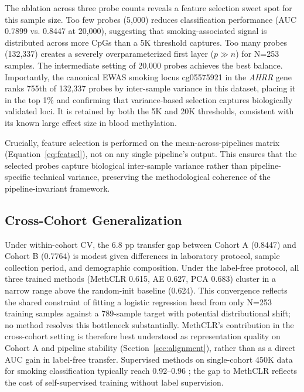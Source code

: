 \documentclass[conference]{IEEEtran}
\begin{document}
The ablation across three probe counts reveals a feature selection sweet spot for this sample size. Too few probes (5,000) reduces classification performance (AUC 0.7899 vs. 0.8447 at 20,000), suggesting that smoking-associated signal is distributed across more CpGs than a 5K threshold captures. Too many probes (132,337) creates a severely overparameterized first layer ($p \gg n$) for N=253 samples. The intermediate setting of 20,000 probes achieves the best balance. Importantly, the canonical EWAS smoking locus cg05575921 in the \textit{AHRR} gene \cite{joehanes2016} ranks 755th of 132,337 probes by inter-sample variance in this dataset, placing it in the top 1\% and confirming that variance-based selection captures biologically validated loci. It is retained by both the 5K and 20K thresholds, consistent with its known large effect size in blood methylation.

Crucially, feature selection is performed on the mean-across-pipelines matrix (Equation~\ref{eq:featsel}), not on any single pipeline's output. This ensures that the selected probes capture biological inter-sample variance rather than pipeline-specific technical variance, preserving the methodological coherence of the pipeline-invariant framework.

\subsection{Cross-Cohort Generalization}

Under within-cohort CV, the 6.8 pp transfer gap between Cohort A (0.8447) and Cohort B (0.7764) is modest given differences in laboratory protocol, sample collection period, and demographic composition. Under the label-free protocol, all three trained methods (MethCLR 0.615, AE 0.627, PCA 0.683) cluster in a narrow range above the random-init baseline (0.624). This convergence reflects the shared constraint of fitting a logistic regression head from only N=253 training samples against a 789-sample target with potential distributional shift; no method resolves this bottleneck substantially. MethCLR's contribution in the cross-cohort setting is therefore best understood as representation quality on Cohort A and pipeline stability (Section~\ref{sec:alignment}), rather than as a direct AUC gain in label-free transfer. Supervised methods on single-cohort 450K data for smoking classification typically reach 0.92--0.96 \cite{joehanes2016}; the gap to MethCLR reflects the cost of self-supervised training without label supervision.
\end{document}
